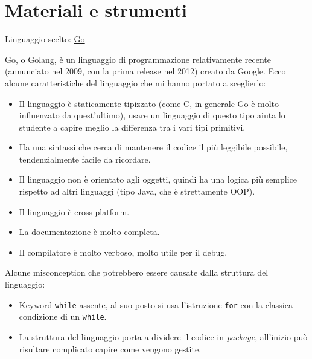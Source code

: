 \section{Materiali e strumenti}
Linguaggio scelto: \href{https://go.dev/}{Go}

Go, o Golang, è un linguaggio di programmazione relativamente recente (annunciato nel 2009, con la prima release nel 2012) creato da Google. Ecco alcune caratteristiche del linguaggio che mi hanno portato a sceglierlo:

\begin{itemize}
    \item Il linguaggio è staticamente tipizzato (come C, in generale Go è molto influenzato da quest'ultimo), usare un linguaggio di questo tipo aiuta lo studente a capire meglio la differenza tra i vari tipi primitivi.
    \item Ha una sintassi che cerca di mantenere il codice il più leggibile possibile, tendenzialmente facile da ricordare.
    \item Il linguaggio non è orientato agli oggetti, quindi ha una logica più semplice rispetto ad altri linguaggi (tipo Java, che è strettamente OOP).
    \item Il linguaggio è cross-platform.
    \item La documentazione è molto completa.
    \item Il compilatore è molto verboso, molto utile per il debug.
\end{itemize}

Alcune misconception che potrebbero essere causate dalla struttura del linguaggio:

\begin{itemize}
    \item Keyword \texttt{while} assente, al suo posto si usa l'istruzione \texttt{for} con la classica condizione di un \texttt{while}.
    \item La struttura del linguaggio porta a dividere il codice in \textit{package}, all'inizio può risultare complicato capire come vengono gestite.
\end{itemize}
